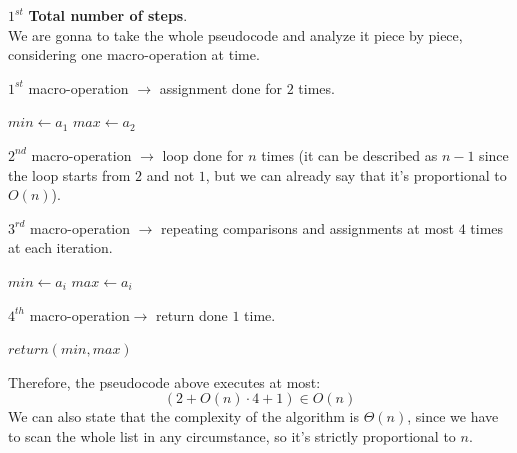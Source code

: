 \begin{example}[title = Computational task as a function]
    $1^{st}$ \textbf{Total number of steps}. \\ 
    We are gonna to take the whole pseudocode and analyze it piece by piece, considering one macro-operation at time. \vspace{7pt}

    $1^{st}$ macro-operation $\rightarrow$ assignment done for $2$ times. 
    \begin{algorithmic}
        \State $min \gets a_1$
        \State $max \gets a_2$
    \end{algorithmic} \vspace{3.5pt}

    $2^{nd}$ macro-operation $\rightarrow$ loop done for $n$ times (it can be described as $n-1$ since the loop starts from $2$ and not $1$,
    but we can already say that it's proportional to $O(n)$).
    \begin{algorithmic}
        \EndFor
    \end{algorithmic} \vspace{3.5pt}

    $3^{rd}$ macro-operation $\rightarrow$ repeating comparisons and assignments at most $4$ times at each iteration.
    \begin{algorithmic}
            \State $min \gets a_i$
            \State $max \gets a_i$
        \EndIf
    \end{algorithmic} \vspace{3.5pt}

    $4^{th}$ macro-operation$\rightarrow$ return done $1$ time.
    \begin{algorithmic}
        \State $return(min, max)$
    \end{algorithmic} \vspace{7pt}

    Therefore, the pseudocode above executes at most:
    $$ (2 + O(n) \cdot 4 + 1) \in O(n) $$
    We can also state that the complexity of the algorithm is $ \Theta(n)$, since we have to scan the whole list in any circumstance, so it's strictly 
    proportional to $n$. \vspace{7pt}


\end{example}
